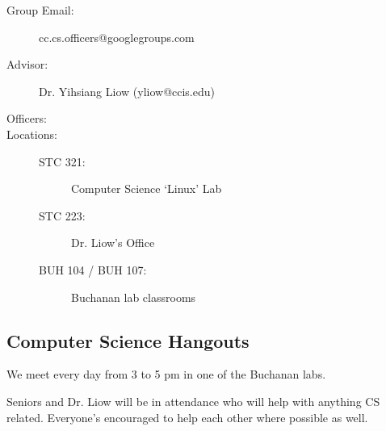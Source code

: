 \begin{description}
\item[{Group Email:}] cc.cs.officers@googlegroups.com
\item[{Advisor:}] Dr. Yihsiang Liow (yliow@ccis.edu)
\item[{Officers:}] \hspace*{1em}
\item[{Locations:}] \hspace*{1em}
\begin{description}
\item[{STC 321:}] Computer Science \textquoteleft{}Linux\textquoteright{} Lab
\item[{STC 223:}] Dr. Liow's Office
\item[{BUH 104 / BUH 107:}] Buchanan lab classrooms
\end{description}
\end{description}

\newpage

\subsection{Computer Science Hangouts}
\label{sec:orgheadline5}

We meet every day from 3 to 5 pm in one of the Buchanan labs.

Seniors and Dr. Liow will be in attendance who will help with anything CS
related. Everyone's encouraged to help each other where possible as well.


